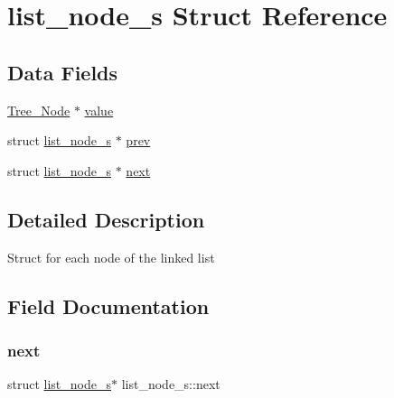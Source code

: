 \hypertarget{structlist__node__s}{}\section{list\+\_\+node\+\_\+s Struct Reference}
\label{structlist__node__s}
\subsection*{Data Fields}
\begin{DoxyCompactItemize}
\item 
\mbox{\hyperlink{list_8h_a68f0ccc88265f29ccc7b9c8133456b67}{Tree\+\_\+\+Node}} $\ast$ \mbox{\hyperlink{structlist__node__s_aaa2c948828e4b204d91773042ef2797c}{value}}
\item 
struct \mbox{\hyperlink{structlist__node__s}{list\+\_\+node\+\_\+s}} $\ast$ \mbox{\hyperlink{structlist__node__s_ae514915b0307961b3b347e8991ed3f12}{prev}}
\item 
struct \mbox{\hyperlink{structlist__node__s}{list\+\_\+node\+\_\+s}} $\ast$ \mbox{\hyperlink{structlist__node__s_a792a4f814d8d0c2106c6a63b0abf666d}{next}}
\end{DoxyCompactItemize}


\subsection{Detailed Description}
Struct for each node of the linked list 

\subsection{Field Documentation}
\mbox{\label{structlist__node__s_a792a4f814d8d0c2106c6a63b0abf666d}} 
\subsubsection{\texorpdfstring{next}{next}}
{\footnotesize\ttfamily struct \mbox{\hyperlink{structlist__node__s}{list\+\_\+node\+\_\+s}}$\ast$ list\+\_\+node\+\_\+s\+::next}

\mbox{\label{structlist__node__s_ae514915b0307961b3b347e8991ed3f12}} 

